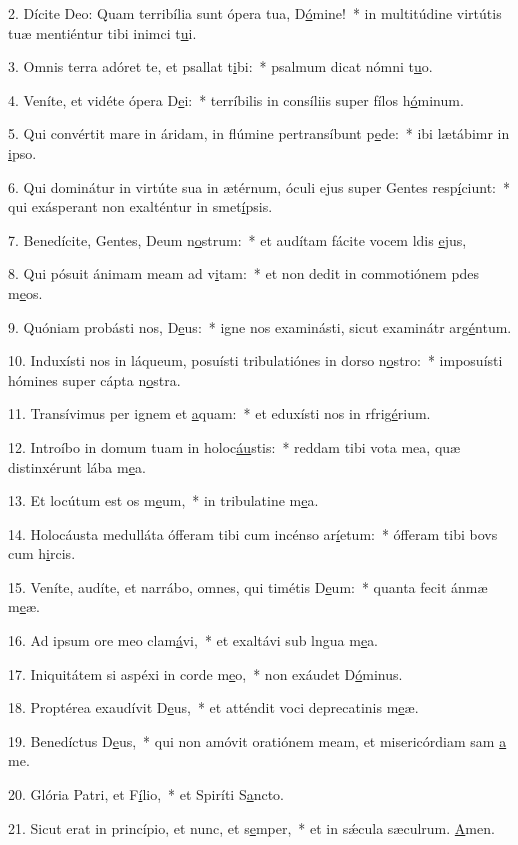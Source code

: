 2. Dícite Deo: Quam terribília sunt ópera tua, D\uline{ó}mine!~* in multitúdine virtútis tuæ mentiéntur tibi inimci t\uline{u}i.\par 
3. Omnis terra adóret te, et psallat t\uline{i}bi:~* psalmum dicat nómni t\uline{u}o.\par 
4. Veníte, et vidéte ópera D\uline{e}i:~* terríbilis in consíliis super fílos h\uline{ó}minum.\par 
5. Qui convértit mare in áridam, in flúmine pertransíbunt p\uline{e}de:~* ibi lætábimr in \uline{i}pso.\par 
6. Qui dominátur in virtúte sua in ætérnum, óculi ejus super Gentes resp\uline{í}ciunt:~* qui exásperant non exalténtur in smet\uline{í}psis.\par 
7. Benedícite, Gentes, Deum n\uline{o}strum:~* et audítam fácite vocem ldis \uline{e}jus,\par 
8. Qui pósuit ánimam meam ad v\uline{i}tam:~* et non dedit in commotiónem pdes m\uline{e}os.\par 
9. Quóniam probásti nos, D\uline{e}us:~* igne nos examinásti, sicut examinátr arg\uline{é}ntum.\par 
10. Induxísti nos in láqueum, posuísti tribulatiónes in dorso n\uline{o}stro:~* imposuísti hómines super cápta n\uline{o}stra.\par 
11. Transívimus per ignem et \uline{a}quam:~* et eduxísti nos in rfrig\uline{é}rium.\par 
12. Introíbo in domum tuam in holoc\uline{áu}stis:~* reddam tibi vota mea, quæ distinxérunt lába m\uline{e}a.\par 
13. Et locútum est os m\uline{e}um,~* in tribulatine m\uline{e}a.\par 
14. Holocáusta medulláta ófferam tibi cum incénso ar\uline{í}etum:~* ófferam tibi bovs cum h\uline{i}rcis.\par 
15. Veníte, audíte, et narrábo, omnes, qui timétis D\uline{e}um:~* quanta fecit ánmæ m\uline{e}æ.\par 
16. Ad ipsum ore meo clam\uline{á}vi,~* et exaltávi sub lngua m\uline{e}a.\par 
17. Iniquitátem si aspéxi in corde m\uline{e}o,~* non exáudet D\uline{ó}minus.\par 
18. Proptérea exaudívit D\uline{e}us,~* et atténdit voci deprecatinis m\uline{e}æ.\par 
19. Benedíctus D\uline{e}us,~* qui non amóvit oratiónem meam, et misericórdiam sam \uline{a} me.\par 
20. Glória Patri, et F\uline{í}lio,~* et Spiríti S\uline{a}ncto.\par 
21. Sicut erat in princípio, et nunc, et s\uline{e}mper,~* et in sǽcula sæculrum. \uline{A}men.\par 

